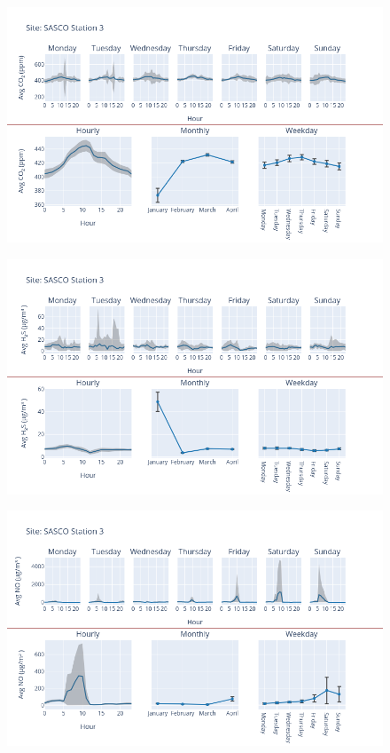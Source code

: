 \documentclass[12pt, oneside]{book}
\begin{document}
{ 
{\begin{figure}[H] 
 \centering 
\includegraphics[width=.88\textwidth, keepaspectratio]{image152} 
 \end{figure}}{} 

{\begin{figure}[H] 
 \centering 
\includegraphics[width=.88\textwidth, keepaspectratio]{image153} 
 \end{figure}}{} 

{\begin{figure}[H] 
 \centering 
\includegraphics[width=.88\textwidth, keepaspectratio]{image154} 
 \end{figure}}{} 

}
\end{document}
